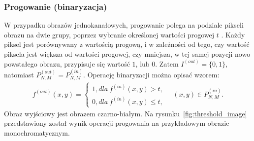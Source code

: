 \subsubsection{Progowanie (binaryzacja)} \label{sssec:threshold}
W przypadku obrazów jednokanałowych, progowanie polega na podziale pikseli obrazu na dwie grupy, poprzez wybranie określonej wartości progowej $t$ \cite{phillips94}. Każdy piksel jest porównywany z wartością progową, i w zależności od tego, czy wartość piksela jest większa od wartości progowej, czy mniejsza, w tej samej pozycji nowo powstałego obrazu, przypisuje się wartość $1$, lub $0$. Zatem $I^{(out)} = \{0, 1\}$, natomiast $P^{(out)}_{N, M} = P^{(in)}_{N, M}$. Operację binaryzacji można opisać wzorem:
\begin{gather*}
  f^{(out)}(x, y) = \left\{\begin{matrix}
  1, dla \: f^{(in)}(x, y) > t,\\
  0, dla \: f^{(in)}(x, y) \leq t,
  \end{matrix}\right. \quad (x, y) \in P^{(in)}_{N,M}.
\end{gather*}
Obraz wyjściowy jest obrazem czarno-białym.
Na rysunku~\ref{fig:threshold_image} przedstawiony został wynik operacji progowania na przykładowym obrazie monochromatycznym.
